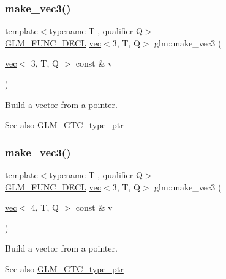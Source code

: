 \subsubsection{\texorpdfstring{make\+\_\+vec3()}{make\_vec3()}\hspace{0.1cm}{\footnotesize\ttfamily [3/5]}}
{\footnotesize\ttfamily template$<$typename T , qualifier Q$>$ \\
\mbox{\hyperlink{setup_8hpp_ab2d052de21a70539923e9bcbf6e83a51}{G\+L\+M\+\_\+\+F\+U\+N\+C\+\_\+\+D\+E\+CL}} \mbox{\hyperlink{structglm_1_1vec}{vec}}$<$3, T, Q$>$ glm\+::make\+\_\+vec3 (\begin{DoxyParamCaption}\item[{\mbox{\hyperlink{structglm_1_1vec}{vec}}$<$ 3, T, Q $>$ const \&}]{v }\end{DoxyParamCaption})\hspace{0.3cm}{\ttfamily [inline]}}

Build a vector from a pointer. \begin{DoxySeeAlso}{See also}
\mbox{\hyperlink{group__gtc__type__ptr}{G\+L\+M\+\_\+\+G\+T\+C\+\_\+type\+\_\+ptr}} 
\end{DoxySeeAlso}
\mbox{\label{group__gtc__type__ptr_ga8b589ed7d41a298b516d2a69169248f1}} 
\subsubsection{\texorpdfstring{make\+\_\+vec3()}{make\_vec3()}\hspace{0.1cm}{\footnotesize\ttfamily [4/5]}}
{\footnotesize\ttfamily template$<$typename T , qualifier Q$>$ \\
\mbox{\hyperlink{setup_8hpp_ab2d052de21a70539923e9bcbf6e83a51}{G\+L\+M\+\_\+\+F\+U\+N\+C\+\_\+\+D\+E\+CL}} \mbox{\hyperlink{structglm_1_1vec}{vec}}$<$3, T, Q$>$ glm\+::make\+\_\+vec3 (\begin{DoxyParamCaption}\item[{\mbox{\hyperlink{structglm_1_1vec}{vec}}$<$ 4, T, Q $>$ const \&}]{v }\end{DoxyParamCaption})\hspace{0.3cm}{\ttfamily [inline]}}

Build a vector from a pointer. \begin{DoxySeeAlso}{See also}
\mbox{\hyperlink{group__gtc__type__ptr}{G\+L\+M\+\_\+\+G\+T\+C\+\_\+type\+\_\+ptr}} 
\end{DoxySeeAlso}
\mbox{\label{group__gtc__type__ptr_gad9e0d36ff489cb30c65ad1fa40351651}} 
